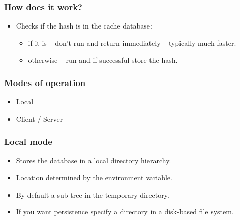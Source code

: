 \documentclass[compress,table,xcolor=table]{beamer}
\begin{document}
\begin{frame}
  \frametitle{How does it work?}
    \LARGE
    \begin{itemize}
        \item Checks if the hash is in the cache database:
        \begin{itemize}
            \Large
            \item if it is -- don't run  and return
                immediately -- typically {\larger much} faster.
            \item otherwise -- run  and if successful
                store the hash.
        \end{itemize}
    \end{itemize}
\end{frame}
\begin{frame}
  \frametitle{Modes of operation}
    \Huge
    \begin{itemize}
        \item Local
        \item Client / Server
    \end{itemize}
\end{frame}
\begin{frame}
    \frametitle{Local mode}
    \LARGE
    \begin{itemize}
        \item Stores the database in a local directory hierarchy.
        \item Location determined by the  environment
            variable.
        \item By default a sub-tree in the temporary directory.
        \item If you want persistence specify a directory in
            a disk-based file system.
    \end{itemize}
\end{frame}
\end{document}
